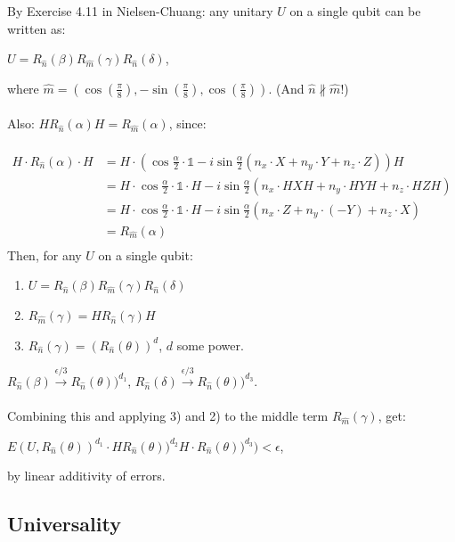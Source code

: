 By Exercise 4.11 in Nielsen-Chuang: any unitary $U$ on a single qubit can be written as:
\begin{center}
    $U = R_{\hat{n}}(\beta) R_{\hat{m}}(\gamma) R_{\hat{n}}(\delta)$,
\end{center}
where $\hat{m}=(\cos(\frac{\pi}{8}), -\sin(\frac{\pi}{8}), \cos(\frac{\pi}{8}))$. (And $\hat{n} \nparallel \hat{m}$!) \\ \\
Also: $H R_{\hat{n}}(\alpha) H = R_{\hat{m}}(\alpha)$, since: \\ \\
\begin{align*}
H \cdot R_{\hat{n}}(\alpha) \cdot H &= H \cdot (\cos{\frac{\alpha}{2}} \cdot \mathds{1} - i \sin{\frac{\alpha}{2}}(n_x \cdot X + n_y \cdot Y + n_z \cdot Z)) H \\
&= H \cdot \cos{\frac{\alpha}{2}} \cdot \mathds{1} \cdot H - i \sin{\frac{\alpha}{2}}(n_x \cdot HXH + n_y \cdot HYH + n_z \cdot HZH) \\
&= H \cdot \cos{\frac{\alpha}{2}} \cdot \mathds{1} \cdot H - i \sin{\frac{\alpha}{2}}(n_x \cdot Z + n_y \cdot (-Y) + n_z \cdot X)\\
&= R_{\hat{m}}(\alpha)\\
\end{align*}
Then, for any $U$ on a single qubit:
\begin{enumerate}
    \item $U = R_{\hat{n}}(\beta) R_{\hat{m}}(\gamma) R_{\hat{n}}(\delta)$
    \item $R_{\hat{m}}(\gamma) = H R_{\hat{n}}(\gamma) H$
    \item $R_{\hat{n}}(\gamma) = (R_{\hat{n}}(\theta))^d$, $d$ some power.
\end{enumerate}

$R_{\hat{n}}(\beta) \xrightarrow{\epsilon / 3} R_{\hat{n}}(\theta))^{d_1}$, $R_{\hat{n}}(\delta) \xrightarrow{\epsilon / 3} R_{\hat{n}}(\theta))^{d_3}$. \\ \\
Combining this and applying 3) and 2) to the middle term $R_{\hat{m}}(\gamma)$, get:
\begin{center}
    $E(U, R_{\hat{n}}(\theta))^{d_1} \cdot HR_{\hat{n}}(\theta))^{d_2} H \cdot R_{\hat{n}}(\theta))^{d_3}) < \epsilon$,
\end{center}
by linear additivity of errors. \\
\subsection{Universality}

